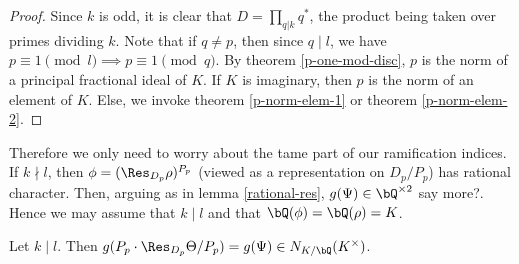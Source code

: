 \begin{proof}
    Since $k$ is odd, it is clear that $D = \prod_{q | k} q^*$, the product being taken over primes dividing $k$. Note that if $q \not= p$, then since $q \mid l$, we have $p \equiv 1 \pmod l \implies p \equiv 1 \pmod q$. By theorem \ref{p-one-mod-disc},  $p$ is the norm of a principal fractional ideal of $K$. If $K$ is imaginary, then $p$ is the norm of an element of $K$. Else, we invoke theorem \ref{p-norm-elem-1} or theorem \ref{p-norm-elem-2}.
\end{proof}

Therefore we only need to worry about the tame part of our ramification indices. If $k \nmid l$, then $\phi = (\Res_{D_p} \rho)^{P_p}$ (viewed as a representation on $D_p / P_p$) has rational character. Then, arguing as in lemma \ref{rational-res}, $g(\Psi) \in \bQ^{\times 2}$ {\color{red} say more?}.
Hence we may assume that $k \mid l$ and that $\bQ(\phi) = \bQ(\rho) = K$.

\begin{prop}\label{semi-stable-gd}
    Let $k \mid l$. Then $g(P_p \cdot \Res_{D_p}\Theta / P_p) = g(\Psi) \in N_{K / \bQ}(K^{\times})$.   
\end{prop}

